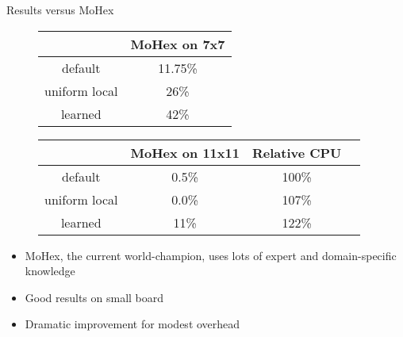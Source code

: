 \documentclass{beamer}
\begin{document}

\begin{frame}{Results versus MoHex}
\begin{figure}
	\begin{center}
		\begin{tabular}{c | c}
		& MoHex on 7x7 \\
		\hline
		default & 11.75\% \\
		uniform local & 26\% \\
		learned & 42\% \\
		\end{tabular}
	\end{center}
\end{figure}
\begin{figure}
	\begin{center}
		\begin{tabular}{c  | c c c}
		& MoHex on 11x11 & Relative CPU \\
		\hline
		default & 0.5\% & 100\% \\
		uniform local & 0.0\% & 107\% \\
		learned & 11\% & 122\% \\
		\end{tabular}
	\end{center}
\end{figure}
\begin{itemize}
	\item MoHex, the current world-champion, uses lots of expert and domain-specific knowledge
	\item Good results on small board
	\item Dramatic improvement for modest overhead
\end{itemize}
\end{frame}
\end{document}
